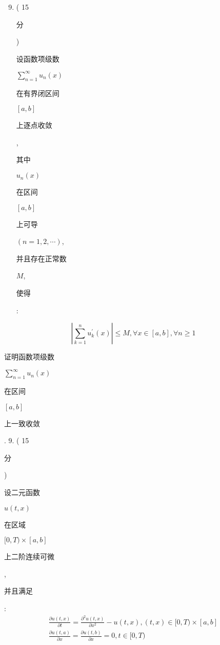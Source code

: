 \documentclass[10pt]{article}
\begin{document}
\begin{enumerate}
  \setcounter{enumi}{8}
  \item ( 15 \begin{CJK}{UTF8}{mj}分\end{CJK}) \begin{CJK}{UTF8}{mj}设函数项级数\end{CJK} $\sum_{n=1}^{\infty} u_{n}(x)$ \begin{CJK}{UTF8}{mj}在有界闭区间\end{CJK} $[a, b]$ \begin{CJK}{UTF8}{mj}上逐点收敛\end{CJK},\begin{CJK}{UTF8}{mj}其中\end{CJK} $u_{n}(x)$ \begin{CJK}{UTF8}{mj}在区间\end{CJK} $[a, b]$ \begin{CJK}{UTF8}{mj}上可导\end{CJK} $(n=1,2, \cdots)$, \begin{CJK}{UTF8}{mj}并且存在正常数\end{CJK} $M$, \begin{CJK}{UTF8}{mj}使得\end{CJK}:
\end{enumerate}
$$
\left|\sum_{k=1}^{n} u_{k}^{\prime}(x)\right| \leq M, \forall x \in[a, b], \forall n \geq 1
$$
\begin{CJK}{UTF8}{mj}证明函数项级数\end{CJK} $\sum_{n=1}^{\infty} u_{n}(x)$ \begin{CJK}{UTF8}{mj}在区间\end{CJK} $[a, b]$ \begin{CJK}{UTF8}{mj}上一致收敛\end{CJK}. 9. ( 15 \begin{CJK}{UTF8}{mj}分\end{CJK}) \begin{CJK}{UTF8}{mj}设二元函数\end{CJK} $u(t, x)$ \begin{CJK}{UTF8}{mj}在区域\end{CJK} $[0, T) \times[a, b]$ \begin{CJK}{UTF8}{mj}上二阶连续可微\end{CJK}, \begin{CJK}{UTF8}{mj}并且满足\end{CJK}:
$$
\begin{gathered}
\frac{\partial u(t, x)}{\partial t}=\frac{\partial^{2} u(t, x)}{\partial x^{2}}-u(t, x),(t, x) \in[0, T) \times[a, b] \\
\frac{\partial u(t, a)}{\partial x}=\frac{\partial u(t, b)}{\partial x}=0, t \in[0, T)
\end{gathered}
$$
\end{document}
